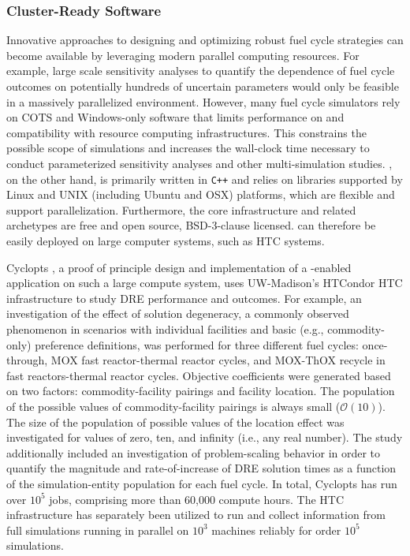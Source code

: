 \subsubsection{Cluster-Ready Software}

Innovative approaches to designing and optimizing robust fuel cycle strategies can become available by leveraging modern parallel computing resources.  For example, large scale sensitivity analyses to quantify the dependence of fuel cycle outcomes on potentially hundreds of uncertain parameters would only be feasible in a massively parallelized environment.
However, many fuel cycle simulators rely on \gls{COTS} and Windows-only software that limits
performance on and compatibility with resource computing infrastructures. This
constrains the possible scope of simulations and increases the wall-clock time necessary to conduct parameterized sensitivity
analyses and other multi-simulation studies. \Cyclus, on the other hand, is
primarily written in \texttt{C++} and relies on
libraries supported by Linux and UNIX (including Ubuntu and OSX) platforms,
which are flexible and support parallelization.
Furthermore, the core infrastructure and related archetypes are free and
open source, BSD-3-clause licensed.  \Cyclus can therefore be easily deployed
on large computer systems, such as \gls{HTC} systems.

Cyclopts \cite{gidden_cyclopts_2015}, a proof of principle design and
implementation of a \Cyclus-enabled application on such a large compute system,
uses UW-Madison's HTCondor \gls{HTC} infrastructure to study DRE performance and
outcomes. For example, an investigation of the effect of solution degeneracy, a
commonly observed phenomenon in scenarios with individual facilities and basic
(e.g., commodity-only) preference definitions, was performed for three different
fuel cycles: once-through, \gls{MOX} fast reactor-thermal reactor cycles, and
\gls{MOX}-\gls{ThOX} recycle in fast reactors-thermal reactor cycles. Objective
coefficients were generated based on two factors: commodity-facility pairings
and facility location. The population of the possible values of
commodity-facility pairings is always small ($\mathcal{O}(10)$). The size of the
population of possible values of the location effect was investigated for values
of zero, ten, and infinity (i.e., any real number). The study additionally
included an investigation of problem-scaling behavior in order to quantify the
magnitude and rate-of-increase of DRE solution times as a function of the
simulation-entity population for each fuel
cycle\cite{gidden_agent-based_2015}. In total, Cyclopts has run over $10^5$
jobs, comprising more than 60,000 compute hours. The \gls{HTC} infrastructure
has separately been utilized to run and collect information from full \Cyclus
simulations running in parallel on $10^3$ machines reliably for order $10^5$
simulations.

